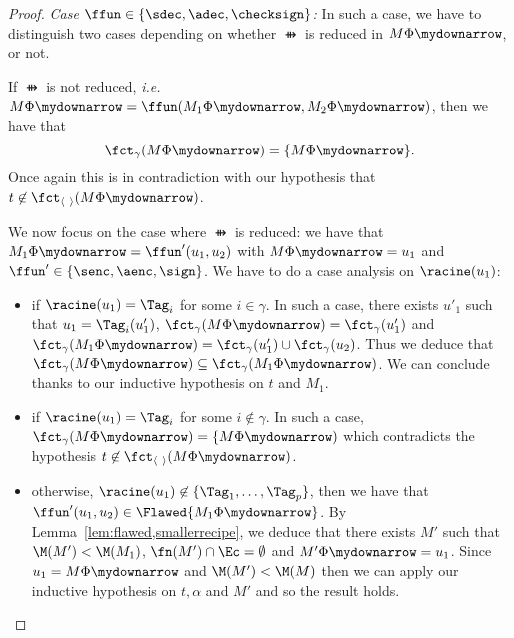 \begin{proof}
\smallskip{}

 \emph{Case $\ffun \in \{\sdec, \adec, \checksign\}$:} In such a case,
 we have to distinguish two cases depending on whether $\ffun$ is reduced in
 $M\Phi\mydownarrow$, or not.

 If $\ffun$ is not reduced, \emph{i.e.} $M\Phi\mydownarrow =
 \ffun(M_1\Phi\mydownarrow, M_2\Phi\mydownarrow)$, then we have that
 \[
\fct_\gamma(M\Phi\mydownarrow) = \{M\Phi\mydownarrow\}.
\] 
Once again this is in contradiction with our hypothesis that $t \not\in \fctpair(M\Phi\mydownarrow)$.

We now focus on the case where $\ffun$ is reduced: we have that $M_1\Phi\mydownarrow =
 \ffun'(u_1,u_2)$ with $M\Phi\mydownarrow = u_1$ and $\ffun' \in \{\senc,
 \aenc, \sign\}$. We have to do a case analysis on $\racine(u_1)$:
 \begin{itemize}
 \item if $\racine(u_1) = \Tag_i$ for some $i \in \gamma$. In such a case, there exists $u'_1$ such that $u_1 = \Tag_i(u'_1)$, $\fct_\gamma(M\Phi\mydownarrow) = \fct_\gamma(u'_1)$ and $\fct_\gamma(M_1\Phi\mydownarrow) = \fct_\gamma(u'_1) \cup \fct_\gamma(u_2)$. Thus we deduce that $\fct_\gamma(M\Phi\mydownarrow) \subseteq \fct_\gamma(M_1\Phi\mydownarrow)$. We can conclude thanks to our inductive hypothesis on $t$ and $M_1$. 
\item if $\racine(u_1) = \Tag_i$ for some $i \not\in \gamma$. In such a case, $\fct_\gamma(M\Phi\mydownarrow) = \{ M\Phi\mydownarrow)$ which contradicts the hypothesis $t \not\in \fctpair(M\Phi\mydownarrow)$.
\item otherwise, $\racine(u_1) \not\in \{\Tag_1,\ldots,\Tag_p\}$, then we
have that $\ffun'(u_1,u_2) \in \Flawed{M_1\Phi\mydownarrow}$. By Lemma~\ref{lem:flawed,smallerrecipe}, we deduce that there exists $M'$ such that $\M(M') < \M(M_1)$, $\fn(M') \cap \Ec = \emptyset$ and $M'\Phi\mydownarrow = u_1$. Since $u_1 = M\Phi\mydownarrow$ and $\M(M') < \M(M)$ then we can apply our inductive hypothesis on $t, \alpha$ and $M'$ and so the result holds.
\end{itemize}
\end{proof}



